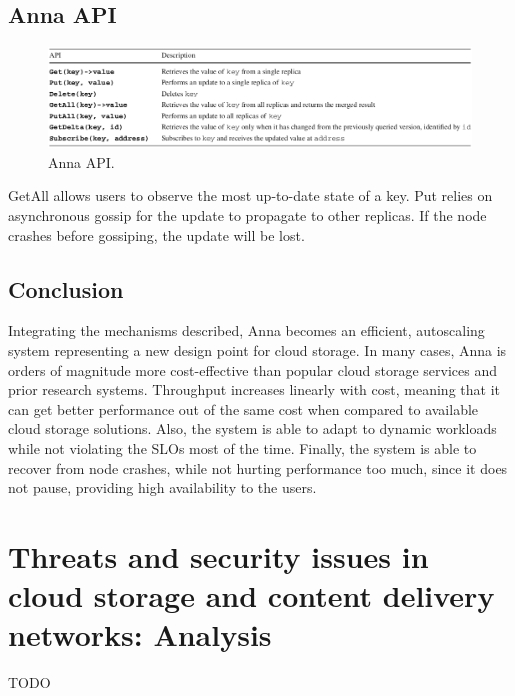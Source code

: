 \documentclass[14pt,oneside]{extreport}
\newcommand*\fpar{\hspace{1ex}}
\begin{document}
  \section{Anna API}
  
  \begin{figure}[htbp]
    \centerline{\includegraphics[scale=0.5]{images/paper2/API.png}}
    \caption{Anna API.}
    \label{fig}
  \end{figure}

  \fpar GetAll allows users to observe the most up-to-date state of a key. Put relies on asynchronous gossip for the update to propagate to other replicas. If the node crashes before gossiping, the update will be lost.

  \section{Conclusion}
  \fpar Integrating the mechanisms described, Anna becomes an efficient, autoscaling system representing a new design point for cloud storage. In many cases, Anna is orders of magnitude more cost-effective than popular cloud storage services and prior research systems. Throughput increases linearly with cost, meaning that it can get better performance out of the same cost when compared to available cloud storage solutions. Also, the system is able to adapt to dynamic workloads while not violating the SLOs most of the time. Finally, the system is able to recover from node crashes, while not hurting performance too much, since it does not pause, providing high availability to the users.

\chapter{\Large{Threats and security issues in cloud storage and content delivery networks: Analysis \cite{paper3}}}
\fpar TODO

\end{document}
